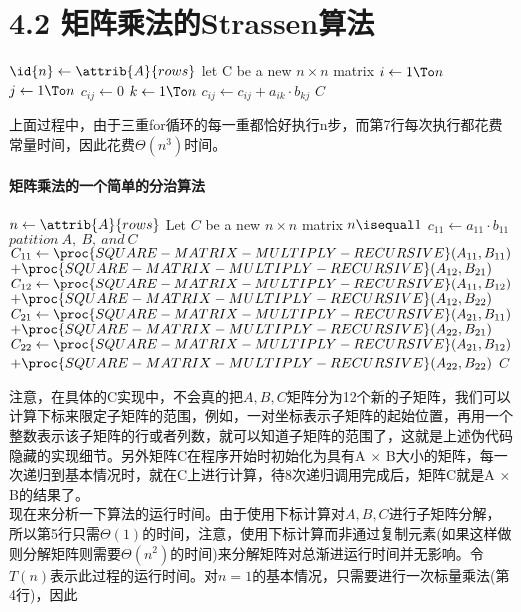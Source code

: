 \documentclass[a4paper,11pt]{article}
\begin{document}
\section*{4.2 矩阵乘法的Strassen算法}
\begin{codebox}
	\li $\id{n} \gets \attrib{A}{rows}$
	\li let C be a new $n \times n$ matrix
	\li \For $i \gets 1 \To n$
	\li		\Do
				\For $j \gets 1 \To n$
	\li			\Do $c_{ij} \gets 0$
	\li			\For $k \gets 1 \To n$
	\li				\Do	$c_{ij} \gets c_{ij} + a_{ik} \cdot b_{kj}$
						\End
					\End
				\End
	\li	\Return $C$
\end{codebox}
上面过程中，由于三重for循环的每一重都恰好执行n步，而第7行每次执行都花费常量时间，因此花费$\Theta(n^3)$时间。
\paragraph*{矩阵乘法的一个简单的分治算法}
\begin{codebox}
	\li $n \gets \attrib{A}{rows}$
	\li Let $C$ be a new $n \times n$ matrix
	\li \If $n \isequal 1$
	\li		\Then $c_{11} \gets a_{11} \cdot b_{11}$
	\li		\Else $patition\ A,\ B,\ and \ C$
	\li			$C_{11} \gets \proc{SQUARE-MATRIX-MULTIPLY-RECURSIVE}(A_{11},B_{11})$\\
	\>\>$+\proc{SQUARE-MATRIX-MULTIPLY-RECURSIVE}(A_{12},B_{21})$
	\li			$C_{12} \gets \proc{SQUARE-MATRIX-MULTIPLY-RECURSIVE}(A_{11},B_{12})$\\
	\>\>$+\proc{SQUARE-MATRIX-MULTIPLY-RECURSIVE}(A_{12},B_{22})$
	\li			$C_{21} \gets	\proc{SQUARE-MATRIX-MULTIPLY-RECURSIVE}(A_{21},B_{11})$\\
	\>\>$+\proc{SQUARE-MATRIX-MULTIPLY-RECURSIVE}(A_{22},B_{21})$
	\li			$C_{22} \gets \proc{SQUARE-MATRIX-MULTIPLY-RECURSIVE}(A_{21},B_{12})$\\
	\>\>$+\proc{SQUARE-MATRIX-MULTIPLY-RECURSIVE}(A_{22},B_{22})$
				\End
	\li	\Return $C$
\end{codebox}
注意，在具体的C实现中，不会真的把$A,B,C$矩阵分为12个新的子矩阵，我们可以计算下标来限定子矩阵的范围，例如，一对坐标表示子矩阵的起始位置，再用一个整数表示该子矩阵的行或者列数，就可以知道子矩阵的范围了，这就是上述伪代码隐藏的实现细节。另外矩阵C在程序开始时初始化为具有A $\times$ B大小的矩阵，每一次递归到基本情况时，就在C上进行计算，待8次递归调用完成后，矩阵C就是A $\times$ B的结果了。\\
现在来分析一下算法的运行时间。由于使用下标计算对$A,B,C$进行子矩阵分解，所以第5行只需$\Theta(1)$的时间，注意，使用下标计算而非通过复制元素(如果这样做则分解矩阵则需要$\Theta(n^2)$的时间)来分解矩阵对总渐进运行时间并无影响。令$T(n)$表示此过程的运行时间。对$n=1$的基本情况，只需要进行一次标量乘法(第4行)，因此
\end{document}
